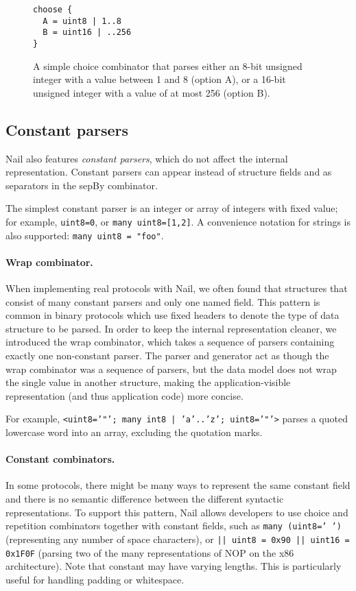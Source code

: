\begin{figure}[tb]
\begin{verbatim}
choose {
  A = uint8 | 1..8
  B = uint16 | ..256
}
\end{verbatim}
\caption{A simple choice combinator that parses either an 8-bit unsigned
integer with a value between 1 and 8 (option A), or a 16-bit unsigned
integer with a value of at most 256 (option B).}
\label{fig:choice}
\end{figure}

\subsection{Constant parsers}

Nail also features \emph{constant parsers}, which do not affect the internal
representation. Constant parsers can appear instead of structure fields and as
separators in the sepBy combinator.

The simplest constant parser is an integer or array of integers with fixed
value; for example, \texttt{uint8=0}, or \texttt{many uint8=[1,2]}. A convenience notation
for strings is also supported: \texttt{many uint8 = "foo"}.

\paragraph{Wrap combinator.} When implementing real protocols with Nail, we often found that
structures that consist of many constant parsers and only one named field. This pattern is
common in binary protocols which use fixed headers to denote the type of data
structure to be parsed.  In order to keep the internal representation cleaner,
we introduced the wrap combinator, which takes a sequence of parsers containing
exactly one non-constant parser. The parser and generator act as though the wrap
combinator was a sequence of parsers, but the data model does not wrap the
single value in another structure, making the application-visible representation
(and thus application code) more concise.

For example, \texttt{<uint8='"'; many int8 | 'a'..'z'; uint8='"'>} parses a quoted
lowercase word into an array, excluding the quotation marks.

\paragraph{Constant combinators.}
In some protocols, there might be many ways to represent the same constant field
and there is no semantic difference between the different syntactic representations.
To support this pattern, Nail allows developers to use choice and repetition
combinators together with constant fields, such as
\texttt{many (uint8=' ')} (representing any number of space characters), or
\texttt{|| uint8 = 0x90 || uint16 = 0x1F0F} (parsing two of the many representations of NOP on the
x86 architecture). Note that constant may have varying lengths.
This is particularly useful for handling padding or whitespace.

